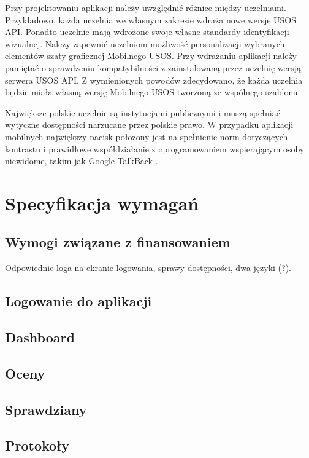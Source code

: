\documentclass{pracamgr}
\begin{document}
Przy projektowaniu aplikacji należy uwzględnić różnice między uczelniami.
Przykładowo, każda uczelnia we własnym zakresie wdraża nowe wersje USOS API.
Ponadto uczelnie mają wdrożone swoje własne standardy identyfikacji wizualnej.
Należy zapewnić uczelniom możliwość personalizacji wybranych elementów szaty
graficznej Mobilnego USOS. Przy wdrażaniu aplikacji należy pamiętać o
sprawdzeniu kompatybilności z zainstalowaną przez uczelnię wersją serwera USOS API.
Z wymienionych powodów zdecydowano, że każda uczelnia będzie miała własną
wersję Mobilnego USOS tworzoną ze wspólnego szablonu.

Największe polskie uczelnie są instytucjami publicznymi i muszą spełniać wytyczne
dostępności narzucane przez polskie prawo. W przypadku aplikacji mobilnych
największy nacisk położony jest na spełnienie norm dotyczących kontrastu i prawidłowe
współdziałanie z oprogramowaniem wspierającym osoby niewidome, takim jak Google
TalkBack \cite{talkback}.

\chapter{Specyfikacja wymagań}

\section{Wymogi związane z finansowaniem}

Odpowiednie loga na ekranie logowania, sprawy dostępności, dwa języki (?).

\section{Logowanie do aplikacji}

\section{Dashboard}

\section{Oceny}

\section{Sprawdziany}

\section{Protokoły}
\end{document}
